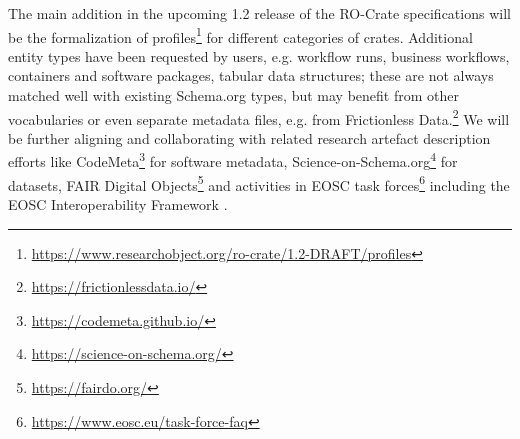 The main addition in the upcoming 1.2 release of the RO-Crate
specifications will be the formalization of
profiles\footnote{\url{https://www.researchobject.org/ro-crate/1.2-DRAFT/profiles}}
for different categories of crates. Additional entity types have been
requested by users, e.g. workflow runs, business workflows, containers
and software packages, tabular data structures; these are not always
matched well with existing Schema.org types, but may benefit from other
vocabularies or even separate metadata files, e.g. from Frictionless
Data.\footnote{\url{https://frictionlessdata.io/}} We will be further aligning
and collaborating with related research artefact description efforts
like CodeMeta\footnote{\url{https://codemeta.github.io/}} for software metadata,
Science-on-Schema.org\footnote{\url{https://science-on-schema.org/}}
\cite{ch5-66} for datasets, FAIR Digital
Objects\footnote{\url{https://fairdo.org/}} \cite{De Smedt 2020} and
activities in EOSC task forces\footnote{\url{https://www.eosc.eu/task-force-faq}}
including the EOSC Interoperability Framework \cite{ch5-75}.